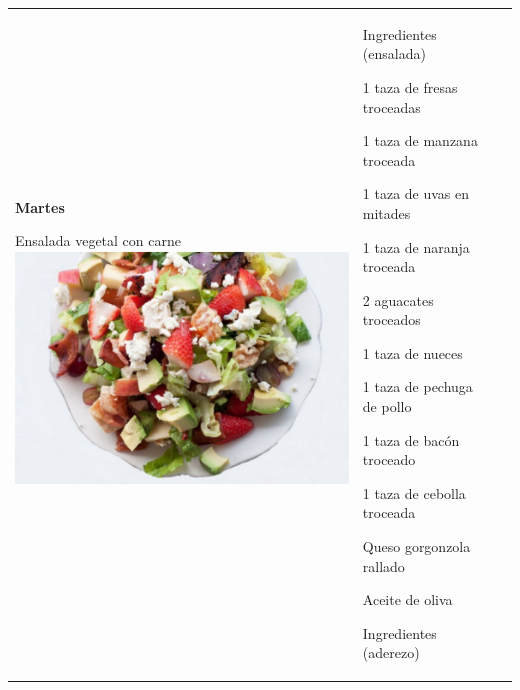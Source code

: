 \documentclass[menu.tex]{subfiles}
\begin{document}
\begin{tabular} {p{3.5cm} p{4cm} p{9cm}}
    \pbox{20cm}
    {
        \rule{0pt}{3ex}\begin{large}\textbf{Martes}\end{large}\\ 
        \rule{0pt}{2ex}Ensalada vegetal con carne\\
        \includegraphics[scale=0.35]{ensalada-vegetal-con-carne} 
    } & 
    \vspace{-1.75cm}            
    \hspace{0.5cm}\begin{footnotesize}Ingredientes (ensalada)\end{footnotesize}
    \begin{compactitem} 
        \begin{scriptsize}
            \item 1 taza de fresas troceadas
            \item 1 taza de manzana troceada
            \item 1 taza de uvas en mitades
            \item 1 taza de naranja troceada
            \item 2 aguacates troceados
            \item 1 taza de nueces
            \item 1 taza de pechuga de pollo
            \item 1 taza de bacón troceado
            \item 1 taza de cebolla troceada
            \item Queso gorgonzola rallado
            \item Aceite de oliva               
        \end{scriptsize}
    \end{compactitem}
    \hspace{0.5cm}\begin{footnotesize}Ingredientes (aderezo)\end{footnotesize}

\end{tabular}
\end{document}
